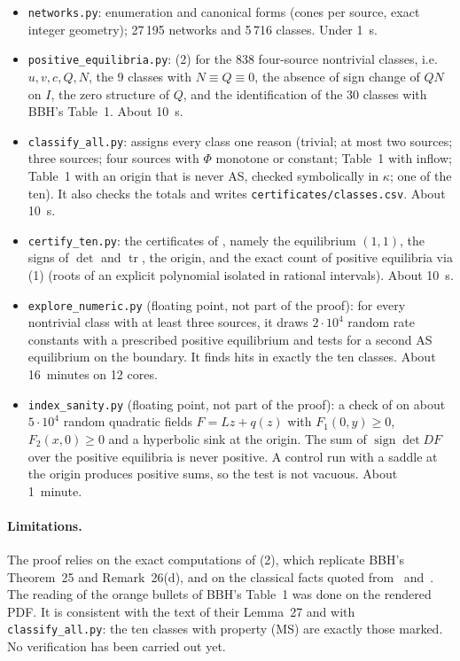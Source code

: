 \documentclass[11pt,a4paper]{report}
\newcommand{\Trop}{\operatorname{tr}}
\begin{document}
\begin{itemize}
\item \texttt{networks.py}: enumeration and canonical forms (cones per source, exact integer geometry); 27\,195
networks and 5\,716 classes. Under 1~s.
\item \texttt{positive\_equilibria.py}: (2) for the 838 four-source nontrivial classes, i.e.
\(u,v,c,Q,N\), the 9 classes with \(N\equiv Q\equiv0\), the absence of sign change of \(QN\) on \(I\), the
zero structure of \(Q\), and the identification of the 30 classes with BBH's Table~1. About 10~s.
\item \texttt{classify\_all.py}: assigns every class one reason (trivial; at most two sources; three sources;
four sources with \(\Phi\) monotone or constant; Table~1 with inflow; Table~1 with an origin that is never AS,
checked symbolically in \(\kappa\); one of the ten). It also checks the totals and writes
\texttt{certificates/classes.csv}. About 10~s.
\item \texttt{certify\_ten.py}: the certificates of , namely the equilibrium \((1,1)\), the signs of
\(\det\) and \(\Trop\), the origin, and the exact count of positive equilibria via (1) (roots of an
explicit polynomial isolated in rational intervals). About 10~s.
\item \texttt{explore\_numeric.py} (floating point, not part of the proof): for every nontrivial class with at least
three sources, it draws \(2\cdot10^4\) random rate constants with a prescribed positive equilibrium and tests for a
second AS equilibrium on the boundary. It finds hits in exactly the ten classes. About 16~minutes on 12 cores.
\item \texttt{index\_sanity.py} (floating point, not part of the proof): a check of  on about
\(5\cdot10^4\) random quadratic fields \(F=Lz+q(z)\) with \(F_1(0,y)\ge0\), \(F_2(x,0)\ge0\) and a hyperbolic sink at the
origin. The sum of \(\operatorname{sign}\det DF\) over the positive equilibria is never positive. A control run with
a saddle at the origin produces positive sums, so the test is not vacuous. About 1~minute.
\end{itemize}

\paragraph{Limitations.} The proof relies on the exact computations of (2), which replicate BBH's
Theorem~25 and Remark~26(d), and on the classical facts quoted from~\autocite{KrasnoselskiiZabreiko1984}
and~\autocite{Perko2001}. The reading of the orange bullets of BBH's Table~1 was done on the rendered PDF.
It is consistent with the text of their Lemma~27 and with \texttt{classify\_all.py}: the ten classes with property
(MS) are exactly those marked. No verification has been carried out yet.

\paperreferences
\end{document}
